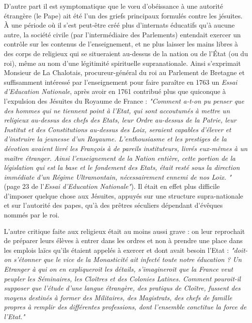  D'autre part il est symptomatique que le vœu d'obéissance à une autorité étrangère (le Pape) ait été l'un des griefs principaux formulés contre les jésuites. À une période où il s'est peut-être créé plus d'internats éducatifs qu'à aucune autre, la société civile (par l'intermédiaire des Parlements) entendait exercer un contrôle sur les contenus de l'enseignement, et ne plus laisser les mains libres à des corps de religieux qui se situeraient au-dessus de la nation ou de l'État (ou du roi), même au nom d'une légitimité spirituelle supranationale. Ainsi s'exprimait Monsieur de La Chalotais, procureur-général du roi au Parlement de Bretagne et suffisamment intéressé par l'enseignement pour faire paraître en 1763 un \emph{Essai d'Education Nationale}, après avoir en 1761 contribué plus que quiconque à l'expulsion des Jésuites du Royaume de France   :
 \emph{"Comment a-t-on pu penser que des hommes qui ne tiennent point à l'Etat, qui sont accoutumés à mettre un religieux au-dessus des chefs des Etats, leur Ordre au-dessus de la Patrie, leur Institut et des Constitutions au-dessus des Loix, seraient capables d'élever et d'instruire la jeunesse d'un Royaume. L'enthousiasme et les prestiges de la dévotion avaient livré les François à de pareils instituteurs, livrés eux-mêmes à un maître étranger. Ainsi l'enseignement de la Nation entière, cette portion de la législation qui est la base et le fondement des Etats, était resté sous la direction immédiate d'un Régime Ultramontain, nécessairement ennemi de nos Loix. "} (page 23 de l'\emph{Essai d'Education Nationale"}). Il était en effet plus difficile d'imposer quelque chose aux Jésuites, appuyés sur une structure supra-nationale et sur l'autorité des papes, qu'à des prêtres séculiers dépendant d'évêques nommés par le roi.
 
 L'autre critique faite aux religieux était au moins aussi grave : on leur reprochait de préparer leurs élèves à entrer dans les ordres et non à prendre une place dans les emplois laïcs qu'ils étaient appelés à exercer et dont avait besoin l'Etat : \emph{"doit-on s'étonner que le vice de la Monasticité ait infecté toute notre éducation ? Un Etranger à qui on en expliqueroit les détails, s'imagineroit que la France veut peupler les Séminaires, les Cloîtres et des Colonies Latines. Comment pouroit-il supposer que l'étude d'une langue étrangère, des pratiqus de Cloître, fussent des moyens destinés à former des Militaires, des Magistrats, des chefs de famille propres à remplir des différentes professions, dont l'ensemble conctitue la force de l'Etat."}
 
